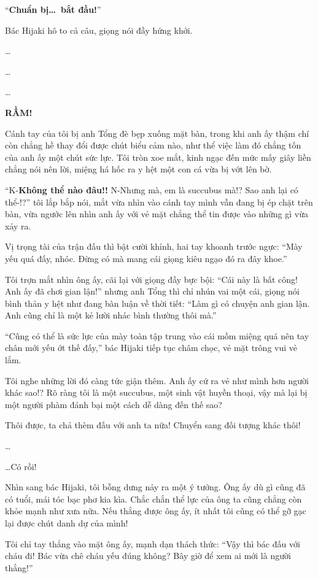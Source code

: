 \documentclass[../main.tex]{subfiles}
\begin{document}
``\textbf{Chuẩn bị\dots\ bắt đầu!}''

Bác Hijaki hô to cả câu, giọng nói đầy hứng khởi.

\dots

\dots

\dots

\textbf{RẦM!}

Cánh tay của tôi bị anh Tổng đè bẹp xuống mặt bàn, trong khi anh ấy thậm chí còn chẳng hề thay đổi được chút biểu cảm nào, như thể việc làm đó chẳng tốn của anh ấy một chút sức lực. Tôi tròn xoe mắt, kinh ngạc đến mức mấy giây liền chẳng nói nên lời, miệng há hốc ra y hệt một con cá vừa bị vớt lên bờ.

``K-\textbf{Không thể nào đâu!!} N-Nhưng mà, em là succubus mà!? Sao anh lại có thể-!?'' tôi lắp bắp nói, mắt vừa nhìn vào cánh tay mình vẫn đang bị ép chặt trên bàn, vừa ngước lên nhìn anh ấy với vẻ mặt chẳng thể tin được vào những gì vừa xảy ra.

Vị trọng tài của trận đấu thì bật cười khỉnh, hai tay khoanh trước ngực: ``Mày yếu quá đấy, nhóc. Đừng có mà mang cái giọng kiêu ngạo đó ra đây khoe.''

Tôi trợn mắt nhìn ông ấy, cãi lại với giọng đầy bực bội: ``Cái này là bất công! Anh ấy đã chơi gian lận!'' nhưng anh Tổng thì chỉ nhún vai một cái, giọng nói bình thản y hệt như đang bàn luận về thời tiết: ``Làm gì có chuyện anh gian lận. Anh cũng chỉ là một kẻ lười nhác bình thường thôi mà.''

``Cũng có thể là sức lực của mày toàn tập trung vào cái mồm miệng quá nên tay chân mới yếu ớt thế đấy,'' bác Hijaki tiếp tục châm chọc, vẻ mặt trông vui vẻ lắm.

Tôi nghe những lời đó càng tức giận thêm. Anh ấy cứ ra vẻ như mình hơn người khác sao!? Rõ ràng tôi là một succubus, một sinh vật huyền thoại, vậy mà lại bị một người phàm đánh bại một cách dễ dàng đến thế sao?

Thôi được, ta chả thèm đấu với anh ta nữa! Chuyển sang đối tượng khác thôi!

\dots

\dots Có rồi!

Nhìn sang bác Hijaki, tôi bỗng dưng nảy ra một ý tưởng. Ông ấy dù gì cũng đã có tuổi, mái tóc bạc phơ kia kìa. Chắc chắn thể lực của ông ta cũng chẳng còn khỏe mạnh như xưa nữa. Nếu thắng được ông ấy, ít nhất tôi cũng có thể gỡ gạc lại được chút danh dự của mình!

Tôi chỉ tay thẳng vào mặt ông ấy, mạnh dạn thách thức: ``Vậy thì bác đấu với cháu đi! Bác vừa chê cháu yếu đúng không? Bây giờ để xem ai mới là người thắng!''
\end{document}
